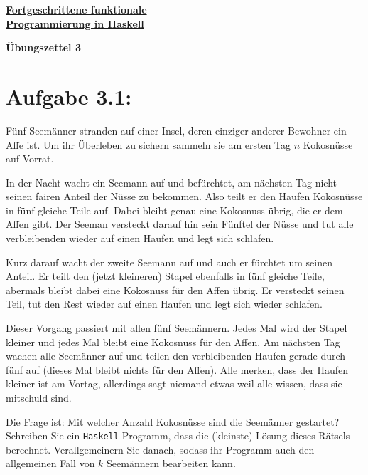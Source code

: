 \documentclass[a4paper,10pt]{scrartcl}
\newcommand{\underfat}[1]{\underline{\textbf{#1}}}
\newcommand{\theuebungszettel}{3}
\begin{document}
\begin{center}
  \begin{huge}
    \underfat{Fortgeschrittene funktionale}\\
    \underfat{Programmierung in Haskell}\\
  \end{huge}
\begin{LARGE}
\textbf{Übungszettel \theuebungszettel}

\end{LARGE}
\end{center}

\section*{Aufgabe \theuebungszettel.1:}

Fünf Seemänner stranden auf einer Insel, deren einziger anderer Bewohner ein Affe ist. Um ihr Überleben zu sichern sammeln sie am ersten Tag $n$ Kokosnüsse auf Vorrat. \smallskip

In der Nacht wacht ein Seemann auf und befürchtet, am nächsten Tag nicht seinen fairen Anteil der Nüsse zu bekommen. Also teilt er den Haufen Kokosnüsse in fünf gleiche Teile auf. Dabei bleibt genau eine Kokosnuss übrig, die er dem Affen gibt. Der Seeman versteckt darauf hin sein Fünftel der Nüsse und tut alle verbleibenden wieder auf einen Haufen und legt sich schlafen.\smallskip

Kurz darauf wacht der zweite Seemann auf und auch er fürchtet um seinen Anteil. Er teilt den (jetzt kleineren) Stapel ebenfalls in fünf gleiche Teile, abermals bleibt dabei eine Kokosnuss für den Affen übrig. Er versteckt seinen Teil, tut den Rest wieder auf einen Haufen und legt sich wieder schlafen.\smallskip

Dieser Vorgang passiert mit allen fünf Seemännern. Jedes Mal wird der Stapel kleiner und jedes Mal bleibt eine Kokosnuss für den Affen. Am nächsten Tag wachen alle Seemänner auf und teilen den verbleibenden Haufen gerade durch fünf auf (dieses Mal bleibt nichts für den Affen). Alle merken, dass der Haufen kleiner ist am Vortag, allerdings sagt niemand etwas weil alle wissen, dass sie mitschuld sind.\bigskip

Die Frage ist: Mit welcher Anzahl Kokosnüsse sind die Seemänner gestartet? Schreiben Sie ein \texttt{Haskell}-Programm, dass die (kleinste) Lösung dieses Rätsels berechnet. Verallgemeinern Sie danach, sodass ihr Programm auch den allgemeinen Fall von $k$ Seemännern bearbeiten kann.
\end{document}
